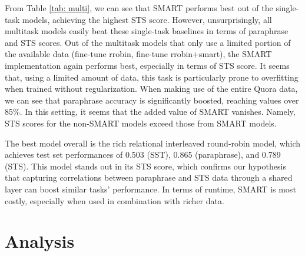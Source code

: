 \documentclass{article}
\begin{document}
From Table \ref{tab: multi}, we can see that SMART performs best out of the single-task models, achieving the highest STS score. However, unsurprisingly, all multitask models easily beat these single-task baselines in terms of paraphrase and STS scores. Out of the multitask models that only use a limited portion of the available data (fine-tune rrobin, fine-tune rrobin+smart), the SMART implementation again performs best, especially in terms of STS score. It seems that, using a limited amount of data, this task is particularly prone to overfitting when trained without regularization. When making use of the entire Quora data, we can see that paraphrase accuracy is significantly boosted, reaching values over 85\%. In this setting, it seems that the added value of SMART vanishes. Namely, STS scores for the non-SMART models exceed those from SMART models. 

The best model overall is the rich relational interleaved round-robin model, which achieves test set performances of 0.503 (SST), 0.865 (paraphrase), and 0.789 (STS). This model stands out in its STS score, which confirms our hypothesis that capturing correlations between paraphrase and STS data through a shared layer can boost similar tasks' performance. In terms of runtime, SMART is most costly, especially when used in combination with richer data.




\section{Analysis}
\label{sec: analysis}
\end{document}
